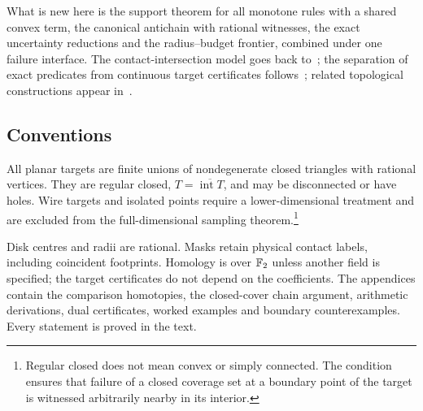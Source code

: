 What is new here is the support theorem for all monotone rules with a shared convex term, the canonical antichain with rational witnesses, the exact uncertainty reductions and the radius--budget frontier, combined under one failure interface. The contact-intersection model goes back to~\cite{original}; the separation of exact predicates from continuous target certificates follows~\cite{ecog}; related topological constructions appear in~\cite{topoi,suspension,linkage}.

\subsection{Conventions}
All planar targets are finite unions of nondegenerate closed triangles with rational vertices. They are regular closed, $T=\overline{\operatorname{int}T}$, and may be disconnected or have holes. Wire targets and isolated points require a lower-dimensional treatment and are excluded from the full-dimensional sampling theorem.\footnote{Regular closed does not mean convex or simply connected. The condition ensures that failure of a closed coverage set at a boundary point of the target is witnessed arbitrarily nearby in its interior.}

Disk centres and radii are rational. Masks retain physical contact labels, including coincident footprints. Homology is over $\mathbb F_2$ unless another field is specified; the target certificates do not depend on the coefficients. The appendices contain the comparison homotopies, the closed-cover chain argument, arithmetic derivations, dual certificates, worked examples and boundary counterexamples. Every statement is proved in the text.
